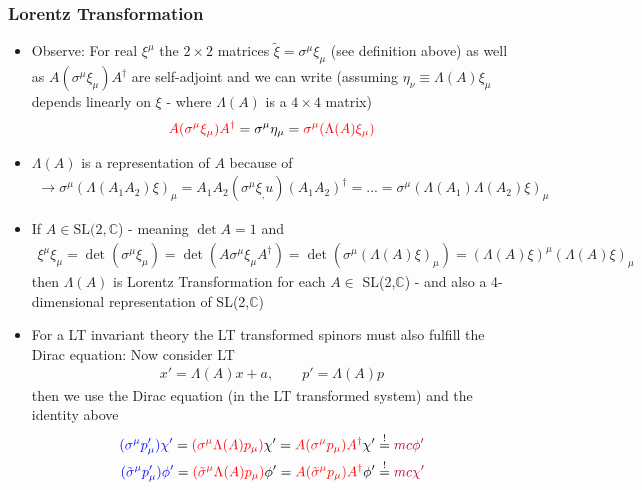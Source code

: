 \documentclass[10pt,a4paper]{report}
\theoremstyle{definition}
\begin{document}
\subsubsection{Lorentz Transformation}
\begin{itemize}
\item Observe: For real $\xi^\mu$ the $2\times2$ matrices $\tilde{\xi}=\sigma^\mu \xi_\mu$ (see definition above) as well as $A(\sigma^\mu \xi_\mu)A^\dagger$ are self-adjoint and we can write (assuming $\eta_\nu\equiv\Lambda(A)\xi_\mu$ depends linearly on $\xi$ - where $\Lambda(A)$ is a $4\times4$ matrix)
\begin{align}
\textcolor{red}{A(\sigma^\mu \xi_\mu)A^\dagger} = \sigma^\mu \eta_\mu = \textcolor{red}{\sigma^\mu (\Lambda(A)\xi_\mu)}
\end{align}
\item $\Lambda(A)$ is a representation of $A$ because of 
\begin{align}
\rightarrow \sigma^\mu(\Lambda(A_1A_2)\xi)_\mu=A_1A_2(\sigma^\mu\xi_,u)(A_1A_2)^\dagger=...=\sigma^\mu(\Lambda(A_1)\Lambda(A_2)\xi)_\mu
\end{align}
\item If $A\in \text{SL}(2,\mathbb{C}$) - meaning $\det A = 1$ and 
\begin{align}
\xi^\mu\xi_\mu=\det(\sigma^\mu\xi_\mu)=\det(A\sigma^\mu\xi_\mu A^\dagger)=\det(\sigma^\mu(\Lambda(A)\xi)_\mu)=(\Lambda(A)\xi)^\mu(\Lambda(A)\xi)_\mu
\end{align}
then $\Lambda(A)$ is Lorentz Transformation for each $A\in$ SL(2,$\mathbb{C}$) - and also a 4-dimensional representation of SL(2,$\mathbb{C}$)
\item For a LT invariant theory the LT transformed spinors must also fulfill the Dirac equation: Now consider LT
\begin{align}
x'=\Lambda(A)x+a,\qquad p'=\Lambda(A)p
\end{align}
then we use the Dirac equation (in the LT transformed system) and the identity above
\begin{align}
\textcolor{blue}{(\sigma^\mu p'_\mu)\chi'}=\textcolor{red}{(\sigma^\mu \Lambda(A)p_\mu)}\chi'
=\textcolor{red}{A(\sigma^\mu p_\mu)A^\dagger}\chi'
&\overset{!}{=}\textcolor{purple}{mc\phi'}
\\
\textcolor{blue}{(\tilde{\sigma}^\mu p'_\mu)\phi'}=\textcolor{red}{(\tilde{\sigma}^\mu \Lambda(A)p_\mu)}\phi'
=\textcolor{red}{A(\tilde{\sigma}^\mu p_\mu)A^\dagger}\phi'
&\overset{!}{=}\textcolor{purple}{mc\chi'}
\end{align}

\end{itemize}
\end{document}
